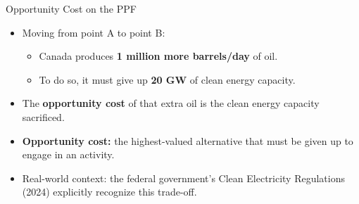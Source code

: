 \documentclass[aspectratio=169]{beamer}
\begin{document}
\begin{frame}{Opportunity Cost on the PPF}
\transfade
\begin{itemize}[<+->]
  \item Moving from point A to point B:
  \begin{itemize}[<+->]
    \item Canada produces \textbf{1 million more barrels/day} of oil.
    \item To do so, it must give up \textbf{20 GW} of clean energy capacity.
  \end{itemize}
  \item The \textbf{opportunity cost} of that extra oil is the clean energy capacity sacrificed.
  \item \textbf{Opportunity cost:} the highest-valued alternative that must be given up to engage in an activity.
  \item Real-world context: the federal government's Clean Electricity Regulations (2024) explicitly recognize this trade-off.
\end{itemize}
\end{frame}
\end{document}
